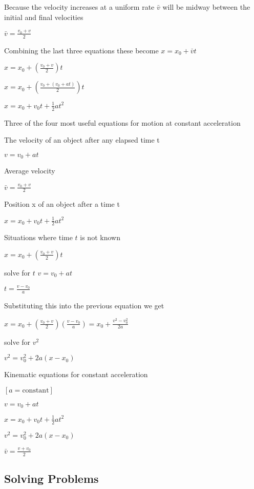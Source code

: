 \documentclass{extarticle}
\begin{document}
\begin{tcolorbox}[enhanced jigsaw,sharp corners,coltext=black,colback=BurntOrange!25!white,boxrule=0pt,breakable,size=minimal]
Because the velocity increases at a uniform rate $\bar{v}$ will be midway between the initial and final velocities

$\bar{v} = \frac{v_0 + v}{2}$


Combining the last three equations these become 
$x = x_0 + \bar{v}t$

$x = x_0 + (\frac{v_0 + v}{2})t$

$x = x_0 + (\frac{v_0 + (v_0 + at)}{2})t$

$x = x_0 + v_0t + \frac{1}{2}at^2$



Three of the four most useful equations for motion at constant acceleration 

The velocity of an object after any elapsed time t

$v = v_0 + at$

Average velocity

$\bar{v} = \frac{v_0 + v}{2}$

Position x of an object after a time t

$x = x_0 + v_0t + \frac{1}{2}at^2$



Situations where time $t$ is not known

$x = x_0 + (\frac{v_0 + v}{2})t$


solve for $t$
$v = v_0 + at$

$t = \frac{v - v_0}{a}$

Substituting this into the previous equation we get 

$x = x_0 + (\frac{v_0 + v}{2})(\frac{v - v_0}{a}) = x_0 + \frac{v^2 - v_0^2}{2a}$

solve for $v^2$

$v^2 = v_0^2 + 2a(x - x_0)$








Kinematic equations for constant acceleration 

$[a = \text{constant}]$

$v = v_0 + at$

$x = x_0 + v_0t + \frac{1}{2}at^2$

$v^2 = v_0^2 + 2a(x - x_0)$

$\bar{v} = \frac{v + v_0}{2}$



\subsection{Solving Problems}


\end{tcolorbox}
\end{document}
